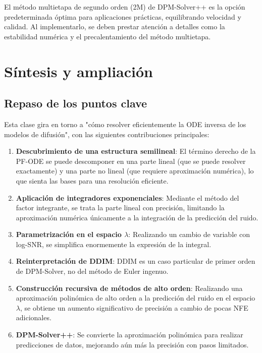 \documentclass[a4paper]{article}
\begin{document}
El método multietapa de segundo orden (2M) de DPM-Solver++ es la opción predeterminada óptima para aplicaciones prácticas, equilibrando velocidad y calidad. Al implementarlo, se deben prestar atención a detalles como la estabilidad numérica y el precalentamiento del método multietapa.


\section{Síntesis y ampliación}

\subsection{Repaso de los puntos clave}

Esta clase gira en torno a "cómo resolver eficientemente la ODE inversa de los modelos de difusión", con las siguientes contribuciones principales:

\begin{enumerate}
    \item \textbf{Descubrimiento de una estructura semilineal}: El término derecho de la PF-ODE se puede descomponer en una parte lineal (que se puede resolver exactamente) y una parte no lineal (que requiere aproximación numérica), lo que sienta las bases para una resolución eficiente.
    \item \textbf{Aplicación de integradores exponenciales}: Mediante el método del factor integrante, se trata la parte lineal con precisión, limitando la aproximación numérica únicamente a la integración de la predicción del ruido.
    \item \textbf{Parametrización en el espacio $\lambda$}: Realizando un cambio de variable con log-SNR, se simplifica enormemente la expresión de la integral.
    \item \textbf{Reinterpretación de DDIM}: DDIM es un caso particular de primer orden de DPM-Solver, no del método de Euler ingenuo.
    \item \textbf{Construcción recursiva de métodos de alto orden}: Realizando una aproximación polinómica de alto orden a la predicción del ruido en el espacio $\lambda$, se obtiene un aumento significativo de precisión a cambio de pocas NFE adicionales.
    \item \textbf{DPM-Solver++}: Se convierte la aproximación polinómica para realizar predicciones de datos, mejorando aún más la precisión con pasos limitados.
\end{enumerate}
\end{document}
